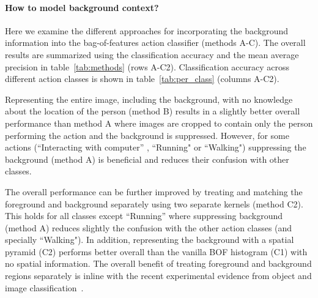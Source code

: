 \documentclass{bmvc2k}
\begin{document}
\paragraph{How to model background context?}
Here we examine the different approaches for incorporating the background information into the bag-of-features action classifier (methods A-C). The overall results are summarized using the classification accuracy and the mean average precision in table~\ref{tab:methods} (rows A-C2). Classification accuracy across different action classes is shown in table~\ref{tab:per_class} (columns A-C2).  

Representing the entire image, including the background, with no knowledge about the location of the person (method B) results in a slightly better overall performance than method A where images are cropped to contain only the person performing the action and the background is suppressed.  However, for some actions (``Interacting with computer'' , ``Running" or ``Walking") suppressing the background (method A) is beneficial and reduces their confusion with other classes. %

The overall performance can be further improved  by treating and matching the foreground and
background separately using two separate kernels (method C2). This holds for all classes except ``Running'' where 
suppressing background (method A) reduces slightly the confusion with the other action classes (and specially ``Walking").
In addition, representing the background with a spatial pyramid (C2) performs better overall than
the vanilla BOF histogram (C1) with no spatial information.
  The overall benefit of treating foreground and background regions separately is inline with the recent experimental evidence
  from object and image classification~\cite{Uijlings09,Zhang07}. 
\end{document}
